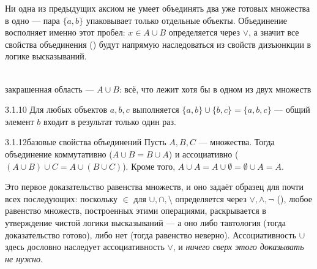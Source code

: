 \begin{intuition}
Ни одна из предыдущих аксиом не умеет объединять два уже готовых множества в одно — пара
$\{a,b\}$ упаковывает только отдельные объекты. Объединение восполняет
именно этот пробел: $x \in A \cup B$ определяется через $\lor$, а значит все свойства
объединения () будут напрямую наследоваться из свойств
дизъюнкции в логике высказываний.

\begin{center}
\\
{\footnotesize\color{intuitiongray}закрашенная область — $A\cup B$: всё, что лежит хотя бы
в одном из двух множеств}
\end{center}
\end{intuition}

\begin{example}{3.1.10}{}
Для любых объектов $a,b,c$ выполняется $\{a,b\} \cup \{b,c\} = \{a,b,c\}$ — общий элемент $b$
входит в результат только один раз.
\end{example}

\begin{lemma}{3.1.12}{базовые свойства объединений}
Пусть $A,B,C$ — множества. Тогда объединение коммутативно ($A \cup B = B \cup A$) и
ассоциативно ($(A \cup B) \cup C = A \cup (B \cup C)$). Кроме того,
$A \cup A = A \cup \emptyset = \emptyset \cup A = A$.
\end{lemma}

\begin{intuition}
Это первое доказательство равенства множеств, и оно задаёт образец для почти всех
последующих: поскольку $\in$ для $\cup,\cap,\setminus$ определяется через $\lor,\land,\neg$
(), любое равенство множеств, построенных этими операциями,
раскрывается в утверждение чистой логики высказываний — а оно либо тавтология (тогда
доказательство готово), либо нет (тогда равенство неверно). Ассоциативность $\cup$ здесь
дословно наследует ассоциативность $\lor$, и \emph{ничего сверх этого доказывать не нужно}.
\end{intuition}

